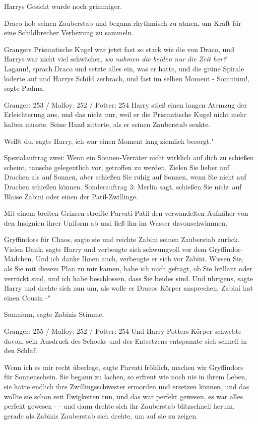 Harrys Gesicht wurde noch grimmiger.

Draco hob seinen Zauberstab und begann rhythmisch zu atmen, um Kraft für eine
Schildbrecher Verhexung zu sammeln.

Grangers Prismatische Kugel war jetzt fast so stark wie die von Draco, und
Harrys war nicht viel schwächer, \emph{wo nahmen die beiden nur die Zeit her?}
\glqq Lagann!\grqq{}, sprach Draco und setzte alles ein, was er hatte, und die
grüne Spirale loderte auf und Harrys Schild zerbrach, und fast im selben Moment
- \glqq Somnium!\grqq{}, sagte Padma.


Granger: 253 / Malfoy: 252 / Potter: 254 Harry stieß einen langen Atemzug der
Erleichterung aus, und das nicht nur, weil er die Prismatische Kugel nicht mehr
halten musste. Seine Hand zitterte, als er seinen Zauberstab senkte.

\glqq Weißt du\grqq{}, sagte Harry, \glqq ich war einen Moment lang ziemlich
besorgt."

Spezialauftrag zwei: Wenn ein Sonnen-Verräter nicht wirklich auf dich zu
schießen scheint, täusche gelegentlich vor, getroffen zu werden. Zielen Sie
lieber auf Drachen als auf Sonnen, aber schießen Sie ruhig auf Sonnen, wenn Sie
nicht auf Drachen schießen können. Sonderauftrag 3: Merlin sagt, schießen Sie
nicht auf Blaise Zabini oder einen der Patil-Zwillinge.

Mit einem breiten Grinsen streifte Parvati Patil den verwandelten Aufnäher von
den Insignien ihrer Uniform ab und ließ ihn im Wasser davonschwimmen.

\glqq Gryffindors für Chaos\grqq{}, sagte sie und reichte Zabini seinen
Zauberstab zurück. \glqq Vielen Dank\grqq{}, sagte Harry und verbeugte sich
schwungvoll vor dem Gryffindor-Mädchen. \glqq Und ich danke Ihnen auch\grqq{},
verbeugte er sich vor Zabini. \glqq Wissen Sie, als Sie mit diesem Plan zu mir
kamen, habe ich mich gefragt, ob Sie brillant oder verrückt sind, und ich habe
beschlossen, dass Sie beides sind. Und übrigens\grqq{}, sagte Harry und drehte
sich nun um, als wolle er Dracos Körper ansprechen, \glqq Zabini hat einen
Cousin -"

\glqq Somnium\grqq{}, sagte Zabinis Stimme.


Granger: 255 / Malfoy: 252 / Potter: 254 Und Harry Potters Körper schwebte
davon, sein Ausdruck des Schocks und des Entsetzens entspannte sich schnell in
den Schlaf.

\glqq Wenn ich es mir recht überlege\grqq{}, sagte Parvati fröhlich, \glqq
machen wir Gryffindors für Sonnenschein.\grqq{} Sie begann zu lachen, so erfreut
wie noch nie in ihrem Leben, sie hatte endlich ihre Zwillingsschwester ermorden
und ersetzen können, und das wollte sie schon seit Ewigkeiten tun, und das war
perfekt gewesen, es war alles perfekt gewesen - - und dann drehte sich ihr
Zauberstab blitzschnell herum, gerade als Zabinis Zauberstab sich drehte, um auf
sie zu zeigen.

